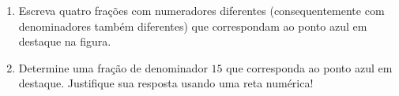 \documentclass[10 pt,usenames,dvipsnames, oneside]{article}
\begin{document}
\begin{enumerate}
\begin{center}
\end{center}
\item     Escreva quatro frações com numeradores diferentes (consequentemente com denominadores também diferentes) que correspondam ao ponto azul em destaque na figura.
\item     Determine uma fração de denominador     $15$ que corresponda ao ponto azul em destaque. Justifique sua resposta usando uma reta numérica!
\end{enumerate} %
\end{document}
